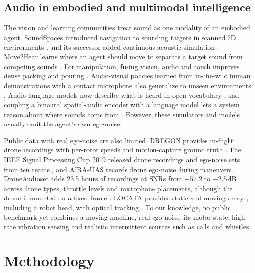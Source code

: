 \documentclass{svproc}
\begin{document}
\subsection{Audio in embodied and multimodal intelligence}
The vision and learning communities treat sound as one modality of an embodied agent.
SoundSpaces introduced navigation to sounding targets in scanned 3D environments \cite{chen2020soundspaces}, and its successor added continuous acoustic simulation \cite{chen2022soundspaces2}.
Move2Hear learns where an agent should move to separate a target sound from competing sounds \cite{majumder2021move2hear}.
For manipulation, fusing vision, audio and touch improves dense packing and pouring \cite{li2022seehearfeel}.
Audio-visual policies learned from in-the-wild human demonstrations with a contact microphone also generalize to unseen environments \cite{liu2024maniwav}.
Audio-language models now describe what is heard in open vocabulary \cite{tang2024salmonn}, and coupling a binaural spatial-audio encoder with a language model lets a system reason about where sounds come from \cite{zheng2024bat}.
However, these simulators and models usually omit the agent's own ego-noise.

Public data with real ego-noise are also limited.
DREGON provides in-flight drone recordings with per-rotor speeds and motion-capture ground truth \cite{strauss2018dregon}.
The IEEE Signal Processing Cup 2019 released drone recordings and ego-noise sets from ten teams \cite{deleforge2019spcup}, and AIRA-UAS records drone ego-noise during maneuvers \cite{ruizespitia2018aira}.
DroneAudioset adds 23.5 hours of recordings at SNRs from $-57.2$ to $-2.5$\,dB across drone types, throttle levels and microphone placements, although the drone is mounted on a fixed frame \cite{gupta2025droneaudioset}.
LOCATA provides static and moving arrays, including a robot head, with optical tracking \cite{lollmann2018locata,evers2020locata}.
To our knowledge, no public benchmark yet combines a moving machine, real ego-noise, its motor state, high-rate vibration sensing and realistic intermittent sources such as calls and whistles.

\section{Methodology}\label{sec:method}
\end{document}
